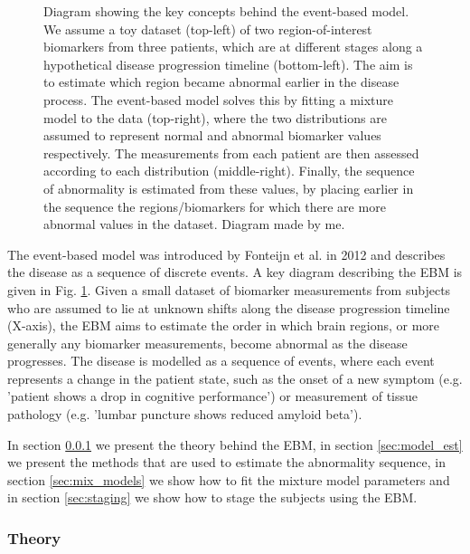 \begin{figure}
\caption[Event-based model diagram]{Diagram showing the key concepts behind the event-based model. We assume a toy dataset (top-left) of two region-of-interest biomarkers from three patients, which are at different stages along a hypothetical disease progression timeline (bottom-left). The aim is to estimate which region became abnormal earlier in the disease process. The event-based model solves this by fitting a mixture model to the data (top-right), where the two distributions are assumed to represent normal and abnormal biomarker values respectively. The measurements from each patient are then assessed according to each distribution (middle-right). Finally, the sequence of abnormality is estimated from these values, by placing earlier in the sequence the regions/biomarkers for which there are more abnormal values in the dataset. Diagram made by me.}
\label{fig:bckEbmDiagram}
\end{figure}


The event-based model was introduced by Fonteijn et al. \cite{fonteijn2012event} in 2012 and describes the disease as a sequence of discrete events. A key diagram describing the EBM is given in Fig. \ref{fig:bckEbmDiagram}. Given a small dataset of biomarker measurements from subjects who are assumed to lie at unknown shifts along the disease progression timeline (X-axis), the EBM aims to estimate the order in which brain regions, or more generally any biomarker measurements, become abnormal as the disease progresses. The disease is modelled as a sequence of events, where each event represents a change in the patient state, such as the onset of a new symptom (e.g. 'patient shows a drop in cognitive performance') or measurement of tissue pathology (e.g. 'lumbar puncture shows reduced amyloid beta'). 

In section \ref{sec:ebm_theory} we present the theory behind the EBM, in section \ref{sec:model_est} we present the methods that are used to estimate the abnormality sequence, in section \ref{sec:mix_models} we show how to fit the mixture model parameters and in section \ref{sec:staging} we show how to stage the subjects using the EBM. 

\subsubsection{Theory}
\label{sec:ebm_theory}

